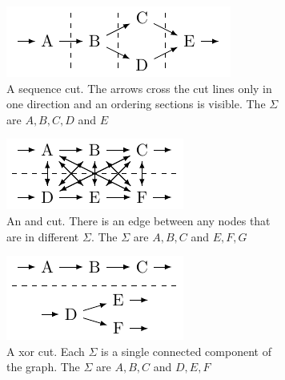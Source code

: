 \documentclass[
	a4paper,
	pagesize,
	pdftex,
	12pt,
	twoside, %
	BCOR=5mm, %
	ngerman,
	fleqn,
	final,
	]{scrartcl}
\begin{document}
\begin{figure}[h]
	\begin{subfigure}[t]{.5\textwidth}
	  \centering
	  \includegraphics[width=\linewidth]{img/seq_cut.pdf}
	  \caption{A sequence cut. The arrows cross the cut lines only in one direction and an ordering sections is visible. The $\Sigma$ are ${A},{B},{C,D}$ and ${E}$}
	  \label{fig:seq_cut}
	\end{subfigure}
	\begin{subfigure}[t]{.5\textwidth}
		\centering
			  \includegraphics[width=0.8\linewidth]{img/and_cut.pdf}
			  \caption{An and cut. There is an edge between any nodes that are in different $\Sigma$. The $\Sigma$ are ${A,B,C}$ and ${E,F,G}$}
			  \label{fig:and_cut}
	\end{subfigure}
	\begin{subfigure}[t]{.5\textwidth}
		\centering
			  \includegraphics[width=0.8\linewidth]{img/xor_cut.pdf}
			  \caption{A xor cut. Each $\Sigma$ is a single connected component of the graph. The $\Sigma$ are ${A,B,C}$ and ${D,E,F}$}
			  \label{fig:xor_cut}
	\end{subfigure}
		\begin{subfigure}[t]{.5\textwidth}

\end{subfigure}
\end{figure}
\end{document}
